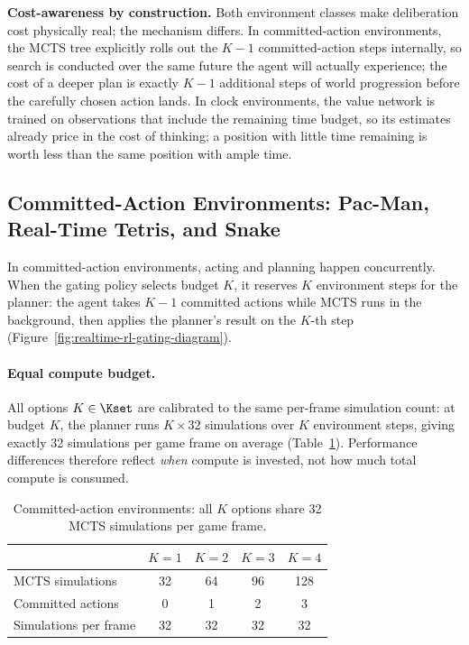 \textbf{Cost-awareness by construction.}
Both environment classes make deliberation cost physically real; the mechanism
differs.
In committed-action environments, the MCTS tree explicitly rolls out the
$K{-}1$ committed-action steps internally, so search is conducted over the
same future the agent will actually experience; the cost of a deeper plan is
exactly $K{-}1$ additional steps of world progression before the carefully
chosen action lands.
In clock environments, the value network is trained on observations that
include the remaining time budget, so its estimates already price in the cost
of thinking; a position with little time remaining is worth less than the same
position with ample time.

\subsection{Committed-Action Environments: Pac-Man, Real-Time Tetris, and Snake}

In committed-action environments, acting and planning happen concurrently.
When the gating policy selects budget $K$, it reserves $K$ environment steps
for the planner: the agent takes $K{-}1$ committed actions while MCTS runs in
the background, then applies the planner's result on the $K$-th step
(Figure~\ref{fig:realtime-rl-gating-diagram}).

\paragraph{Equal compute budget.}
All options $K \in \Kset$ are calibrated to the same per-frame simulation
count: at budget $K$, the planner runs $K \times 32$ simulations over $K$
environment steps, giving exactly 32 simulations per game frame on average
(Table~\ref{tab:budget}).
Performance differences therefore reflect \emph{when} compute is invested, not
how much total compute is consumed.

\begin{table}[h]
  \centering
  \caption{Committed-action environments: all $K$ options share 32 MCTS
    simulations per game frame.}
  \label{tab:budget}
  \small
  \begin{tabular}{lcccc}
    \toprule
    & $K{=}1$ & $K{=}2$ & $K{=}3$ & $K{=}4$ \\
    \midrule
    MCTS simulations       & 32 & 64 & 96 & 128 \\
    Committed actions      & 0  & 1  & 2  & 3   \\
    Simulations per frame  & 32 & 32 & 32 & 32  \\
    \bottomrule
  \end{tabular}
\end{table}

